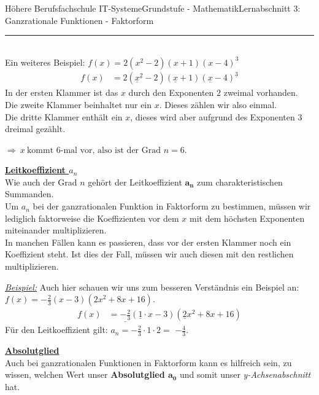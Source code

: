 \documentclass[11pt,twocolumn,oneside,openany,headings=optiontotoc,11pt,numbers=noenddot]{article}
\begin{document}
\begin{worksheet}{Höhere Berufsfachschule IT-Systeme}{Grundstufe - Mathematik}{Lernabschnitt 3: Ganzrationale Funktionen - Faktorform}
		\rule{0.48\textwidth}{0.1pt}\\
		Ein weiteres Beispiel: \(f(x) = 2(x^2-2)(x+1)(x-4)^3\)\\
		\begin{align*}
			f(x) & = 2(\underline{x}^{\underline{2}}-2)(\underline{x}+1)(\underline{x}-4)^{\underline{3}}	
		\end{align*}
		In der ersten Klammer ist das \(x\) durch den Exponenten \(2\) zweimal vorhanden.\\
		Die zweite Klammer beinhaltet nur ein \(x\). Dieses zählen wir also einmal.\\
		Die dritte Klammer enthält ein \(x\), dieses wird aber aufgrund des Exponenten \(3\) dreimal gezählt.
		\par\noindent
		\(\Rightarrow\ x\ \text{kommt\ } 6\text{-mal\ vor,\ also\ ist\ der\ Grad}\) \colorbox{green!10}{\(n = 6\)}.\\
		\par\noindent
		\underline{\textbf{Leitkoeffizient \(a_n\)}}\\
		Wie auch der Grad \(n\) gehört der Leitkoeffizient \(\mathbf{a_n}\) zum charakteristischen Summanden.\\
		Um \(a_n\) bei der ganzrationalen Funktion in Faktorform zu bestimmen, müssen wir lediglich faktorweise die Koeffizienten vor dem \(x\) mit dem höchsten Exponenten miteinander multiplizieren.\\
		In manchen Fällen kann es passieren, dass vor der ersten Klammer noch ein Koeffizient steht. Ist dies der Fall, müssen wir auch diesen mit den restlichen multiplizieren.\\
		\par\noindent
		\textit{\underline{Beispiel:}} Auch hier schauen wir uns zum besseren Verständnis ein Beispiel an: \(f(x) = -\frac{2}{3}(x-3)(2x^2+8x+16)\).
		\begin{align*}
			f(x) & = \underline{-\frac{2}{3}}(\underline{1}\cdot{}x-3)(\underline{2}x^2 + 8x +16)
		\end{align*}
		Für den Leitkoeffizient gilt: \(a_n = -\frac{2}{3}\cdot1\cdot{}2 =\) \colorbox{green!10}{\(-\frac{4}{3}\)}.\\
		\par\noindent
		\textbf{\underline{Absolutglied}}\\
		Auch bei ganzrationalen Funktionen in Faktorform kann es hilfreich sein, zu wissen, welchen Wert unser \textbf{Absolutglied \(\mathbf{a_0}\)} und somit unser \textit{y-Achsenabschnitt} hat.\\

\end{worksheet}
\end{document}
